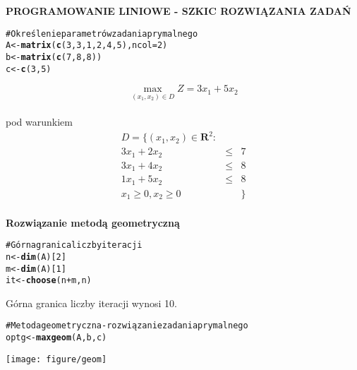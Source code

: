 \documentclass[11pt]{article}\usepackage{graphicx, color}
\makeatletter
\def\maxwidth{ %
  \ifdim\Gin@nat@width>\linewidth
    \linewidth
  \else
    \Gin@nat@width
  \fi
}
\newcommand{\hlfunctioncall}[1]{\textcolor[rgb]{0.501960784313725,0,0.329411764705882}{\textbf{#1}}}%
\newcommand{\hlcomment}[1]{\textcolor[rgb]{0.180392156862745,0.6,0.341176470588235}{#1}}%
\newenvironment{kframe}{%
 \def\at@end@of@kframe{}%
 \ifinner\ifhmode%
  \def\at@end@of@kframe{\end{minipage}}%
  \begin{minipage}{\columnwidth}%
 \fi\fi%
 \def\FrameCommand##1{\hskip\@totalleftmargin \hskip-\fboxsep
 \colorbox{shadecolor}{##1}\hskip-\fboxsep
     \hskip-\linewidth \hskip-\@totalleftmargin \hskip\columnwidth}%
 \MakeFramed {\advance\hsize-\width
   \@totalleftmargin\z@ \linewidth\hsize
   \@setminipage}}%
 {\par\unskip\endMakeFramed%
 \at@end@of@kframe}
\newenvironment{knitrout}{}{} %
\makeatother
\begin{document}
\begin{center}\textbf{\large{PROGRAMOWANIE LINIOWE - SZKIC ROZWIĄZANIA ZADAŃ}}\end{center}



\begin{knitrout}
\color{fgcolor}\begin{kframe}
\begin{alltt}
\hlcomment{# Określenie parametrów zadania prymalnego}
A <- \hlfunctioncall{matrix}(\hlfunctioncall{c}(3, 3, 1, 2, 4, 5), ncol = 2)
b <- \hlfunctioncall{matrix}(\hlfunctioncall{c}(7, 8, 8))
c <- \hlfunctioncall{c}(3, 5)
\end{alltt}
\end{kframe}
\end{knitrout}



\begin{equation*} \max_{(x_1,x_2) \in D} Z= 3x_1+5x_2\end{equation*}\\
pod warunkiem
\begin{eqnarray*}
D=\{(x_1,x_2) \in \mathbf{R}^2: \\ 
3x_1+2x_2 &  \le & 7    \\
3x_1+4x_2 &\le & 8   \\
1x_1+5x_2 & \le & 8    \\
x_1 \ge 0, x_2 \ge 0 & &\} \\
\end{eqnarray*}

\begin{center}\textbf{Rozwiązanie metodą geometryczną}\end{center}

\begin{knitrout}
\color{fgcolor}\begin{kframe}
\begin{alltt}
\hlcomment{# Górna granica liczby iteracji}
n <- \hlfunctioncall{dim}(A)[2]
m <- \hlfunctioncall{dim}(A)[1]
it <- \hlfunctioncall{choose}(n + m, n)
\end{alltt}
\end{kframe}
\end{knitrout}


Górna granica liczby iteracji wynosi 10.



\begin{knitrout}
\color{fgcolor}\begin{kframe}
\begin{alltt}
\hlcomment{# Metoda geometryczna - rozwiązanie zadania prymalnego}
optg <- \hlfunctioncall{maxgeom}(A, b, c)
\end{alltt}
\end{kframe}
\texttt{[image: figure/geom]} 

\end{knitrout}
\end{document}
